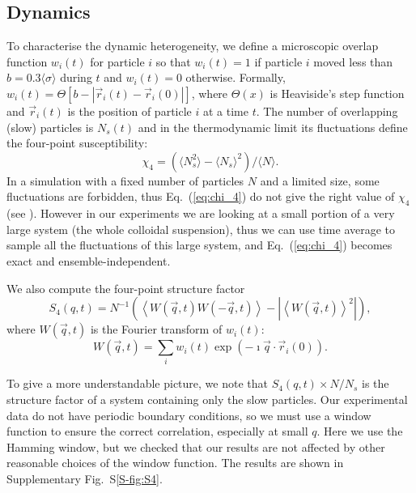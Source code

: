 \subsection*{Dynamics}

To characterise the dynamic heterogeneity, we define a microscopic overlap function $w_i(t)$ for particle $i$ so that $w_i(t)=1$ if particle $i$ moved less than $b=0.3\langle\sigma\rangle$ during $t$ and $w_i(t)=0$ otherwise. 
Formally, $w_i(t) = \Theta [b - |\vec{r}_i(t) - \vec{r}_i(0)|]$, where $\Theta(x)$ is Heaviside’s step function and $\vec{r}_i(t)$ is the position
of particle $i$ at a time $t$.
The number of overlapping (slow) particles is $N_s(t)$ and in the thermodynamic limit its fluctuations define the four-point susceptibility:
\begin{equation}
\chi_4 = (\langle N_s^2\rangle - \langle N_s\rangle^2) /  \langle N\rangle. 
\label{eq:chi_4}
\end{equation}
In a simulation with a fixed number of particles $N$ and a limited size, some fluctuations are forbidden, thus Eq.~(\ref{eq:chi_4}) do not give the right value of $\chi_4$ (see \citep{Flenner2011}). However in our experiments we are looking at a small portion of a very large system (the whole colloidal suspension), thus we can use time average to sample all the fluctuations of this large system, and Eq.~(\ref{eq:chi_4}) becomes exact and ensemble-independent.

We also compute the four-point structure factor~\cite{Flenner2011}
\begin{equation}
	S_4(q,t) = N^{-1}(\left\langle W(\vec{q},t) W(-\vec{q},t) \right\rangle - | \left\langle W(\vec{q},t) \right\rangle^2 |),   
	\label{eq:S4}
\end{equation}
where $W(\vec{q},t)$ is the Fourier transform of $w_i(t)$: 
\begin{equation}
	W(\vec{q},t) = \sum_i w_i(t)\exp(-\imath \vec{q}\cdot\vec{r}_i(0)).  
\end{equation}


To give a more understandable picture, we note that $S_4(q,t)\times N/N_s$ is the structure factor of a system containing only the slow particles. Our experimental data do not have periodic boundary conditions, so we must use a window function to ensure the correct correlation, especially at small $q$. Here we use the Hamming window, but we checked that our results are not affected by other reasonable choices of the window function. The results are shown in Supplementary Fig.~S\ref{S-fig:S4}.

